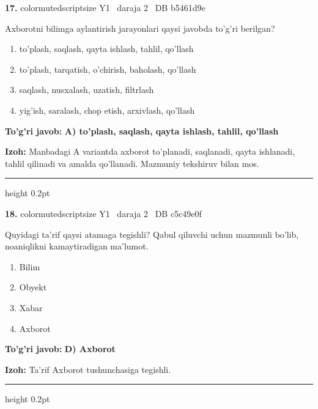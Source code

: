 \documentclass[10pt,a4paper,oneside]{article}
\begin{document}
\noindent\textbf{\color{ink}17.}  {color{muted}scriptsize Y1 \textbullet\ daraja 2 \textbullet\ DB b5461d9e}
\par
Axborotni bilimga aylantirish jarayonlari qaysi javobda to'g'ri berilgan?
\begin{enumerate}[label=\Alph*),leftmargin=9mm]
\item to'plash, saqlash, qayta ishlash, tahlil, qo'llash
\item to'plash, tarqatish, o'chirish, baholash, qo'llash
\item saqlash, nusxalash, uzatish, filtrlash
\item yig'ish, saralash, chop etish, arxivlash, qo'llash
\end{enumerate}
\begin{tcolorbox}[enhanced,breakable,colback=teal!4,colframe=teal!50!black,boxrule=0.5pt,arc=1.1mm,left=3mm,right=3mm,top=1.7mm,bottom=1.7mm,before skip=2mm,after skip=2mm]
\textbf{\color{teal}To'g'ri javob:} \textbf{A) to'plash, saqlash, qayta ishlash, tahlil, qo'llash}
\par\smallskip
\textbf{Izoh:} Manbadagi A variantda axborot to'planadi, saqlanadi, qayta ishlanadi, tahlil qilinadi va amalda qo'llanadi. Mazmuniy tekshiruv bilan mos.
\end{tcolorbox}
\vspace{2mm}\hrule height 0.2pt \vspace{3mm}

\noindent\textbf{\color{ink}18.}  {color{muted}scriptsize Y1 \textbullet\ daraja 2 \textbullet\ DB c5c49e0f}
\par
Quyidagi ta'rif qaysi atamaga tegishli? Qabul qiluvchi uchun mazmunli bo'lib, noaniqlikni kamaytiradigan ma'lumot.
\begin{enumerate}[label=\Alph*),leftmargin=9mm]
\item Bilim
\item Obyekt
\item Xabar
\item Axborot
\end{enumerate}
\begin{tcolorbox}[enhanced,breakable,colback=teal!4,colframe=teal!50!black,boxrule=0.5pt,arc=1.1mm,left=3mm,right=3mm,top=1.7mm,bottom=1.7mm,before skip=2mm,after skip=2mm]
\textbf{\color{teal}To'g'ri javob:} \textbf{D) Axborot}
\par\smallskip
\textbf{Izoh:} Ta'rif Axborot tushunchasiga tegishli.
\end{tcolorbox}
\vspace{2mm}\hrule height 0.2pt \vspace{3mm}
\end{document}
